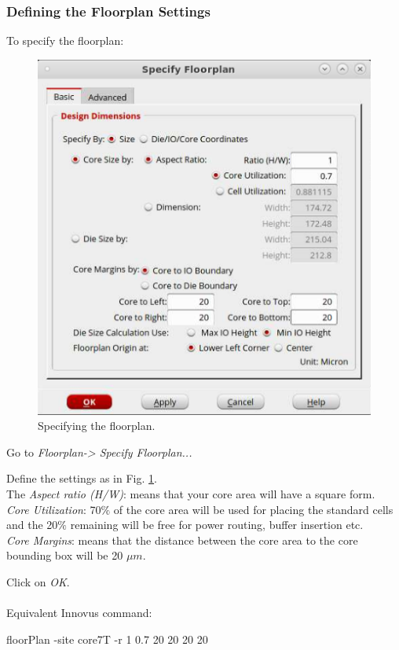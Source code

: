 \subsubsection{Defining the Floorplan Settings}
To specify the floorplan:
\begin{enumerate}
	\parbox[t]{\dimexpr\textwidth-\leftmargin}{%
		\begin{figure}
			\vspace{-15mm}
			\centering
			\vspace{-\baselineskip}
			\includegraphics[scale=0.4]{figures/lab5_backend/floorplan}
			\caption{Specifying the floorplan.}
			\label{fig_floorplan}
		\end{figure}
		\item Go to \textit{Floorplan-> Specify Floorplan...}
		\item Define the settings as in Fig. \ref{fig_floorplan}. \\ The \textit{Aspect ratio (H/W)}: means that your core area will have a square form. \\ \textit{Core Utilization}: 70$\%$ of the core area will be used for placing the standard cells and the 20$\%$ remaining will be free for power routing, buffer insertion etc. \\ \textit{Core Margins}: means that the distance between the core area to the core bounding box will be 20 $\mu$$m$. 
		\item Click on \textit{OK}.  \\ \\
		Equivalent Innovus command:
		\begin{codeline}
			floorPlan -site core7T -r 1 0.7 20 20 20 20
		\end{codeline}
	}
\end{enumerate}

